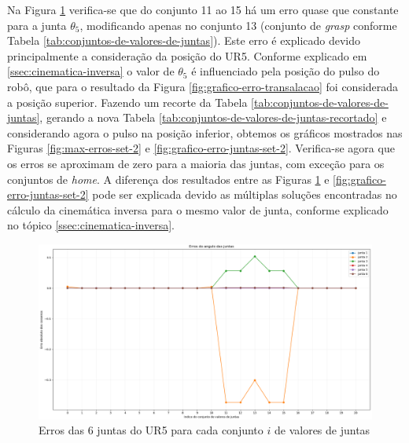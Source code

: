\FloatBarrier

Na Figura \ref{fig:grafico-erro-juntas} verifica-se que do
conjunto 11 ao 15 há um erro quase que constante para a junta $\theta_{5}$, modificando apenas no conjunto
13 (conjunto de \textit{grasp} conforme Tabela \ref{tab:conjuntos-de-valores-de-juntas}). Este erro é explicado
devido principalmente a consideração da posição do UR5. Conforme explicado em \ref{ssec:cinematica-inversa} 
o valor de $\theta_{5}$ é influenciado pela posição do pulso do robô, que para o resultado da Figura \ref{fig:grafico-erro-transalacao}
foi considerada a posição superior. Fazendo um recorte da Tabela \ref{tab:conjuntos-de-valores-de-juntas}, 
gerando a nova Tabela \ref{tab:conjuntos-de-valores-de-juntas-recortado} e considerando agora o pulso na
posição inferior, obtemos os gráficos mostrados nas Figuras \ref{fig:max-erros-set-2} e \ref{fig:grafico-erro-juntas-set-2}.
Verifica-se agora que os erros se aproximam de zero para a maioria das juntas, com exceção para os conjuntos de \textit{home}.
A diferença dos resultados entre as Figuras \ref{fig:grafico-erro-juntas} e \ref{fig:grafico-erro-juntas-set-2} pode ser
explicada devido as múltiplas soluções encontradas no cálculo da cinemática inversa para o mesmo valor de junta,
conforme explicado no tópico \ref{ssec:cinematica-inversa}.

\begin{figure}[htp]
	\centering
	\caption{Erros das 6 juntas do UR5 para cada conjunto $i$ de valores de juntas}
	\label{fig:grafico-erro-juntas}
	\includegraphics[width=\textwidth]{images/erro_do_angulo_das_juntas.png}
\end{figure}

\FloatBarrier

